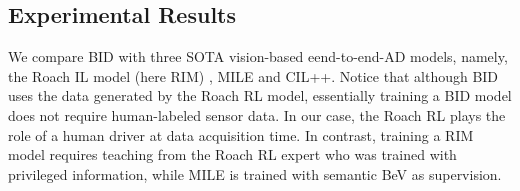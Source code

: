 


\subsection{Experimental Results}
\label{sec:Results}
\hspace{1pc}We compare BID with three SOTA vision-based eend-to-end-AD models, namely, the Roach IL model (here RIM) \cite{Zhang:2021}, MILE \cite{Hu:2022} and CIL++\cite{xiao2023scaling}. 
Notice that although BID uses the data generated by the Roach RL model, essentially training a BID model does not require human-labeled sensor data. 
In our case, the Roach RL plays the role of a human driver at data acquisition time. 
In contrast, training a RIM model requires teaching from the Roach RL expert who was trained with privileged information, while MILE is trained with semantic BeV as supervision.


